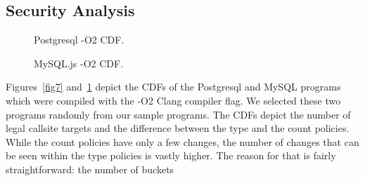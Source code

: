 \subsection{Security Analysis}
\label{RQ5: Security Analysis}

\begin{figure}[h] 
\vspace{-.45cm}
  \begin{minipage}[b]{0.5\linewidth}
    \centering
    \resizebox{1.04\columnwidth}{!}{}
    \caption{Postgresql -O2 CDF.} 
    \label{fig7} 
    \vspace{1ex}
  \end{minipage}%
  \begin{minipage}[b]{0.5\linewidth}
    \centering
    \resizebox{1.04\columnwidth}{!}{} 
    \caption{MySQL.js -O2 CDF.} 
    \label{fig8} 
    \vspace{1ex}
  \end{minipage} 
\end{figure}
Figures~\ref{fig7} and~\ref{fig8}
depict the CDFs of the Postgresql and MySQL programs which were compiled with the -O2 Clang compiler flag. 
We selected these two programs randomly from our sample programs. 
The CDFs depict the number of legal callsite targets and the difference between the type and the count policies. 
While the count  policies have only a few changes, the number of changes that can be seen within the 
type policies is vastly higher. The reason for that is fairly straightforward: the number of buckets 
